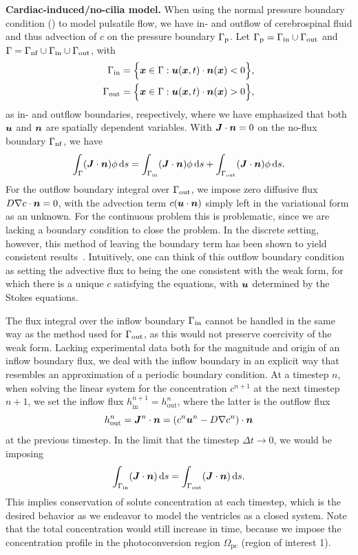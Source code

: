 \documentclass{WileyMSP-template}
\begin{document}
\textbf{Cardiac-induced/no-cilia model.} When using the normal pressure
boundary condition () to model pulsatile flow,
we have in- and outflow of cerebrospinal fluid and thus advection of
$c$ on the pressure boundary $\Gamma_{\mathrm{p}}$.
Let $\Gamma_{\mathrm{p}}=\Gamma_{\mathrm{in}}\cup\Gamma_{\mathrm{out}}$ and $\Gamma = \Gamma_{\mathrm{nf}}\cup\Gamma_{\mathrm{in}}\cup\Gamma_{\mathrm{out}}$, with 
\begin{align*}
    \Gamma_{\mathrm{in}}  &= \Big\{\bm{x}\in\Gamma : \bm{u}(\bm{x}, t)\cdot\bm{n}(\bm{x}) < 0 \Big\}, \\
    \Gamma_{\mathrm{out}} &= \Big\{\bm{x}\in\Gamma : \bm{u}(\bm{x}, t)\cdot\bm{n}(\bm{x}) > 0 \Big\},
\end{align*}
as in- and outflow boundaries, respectively, where we have emphasized that
both $\bm{u}$ and $\bm{n}$ are spatially dependent variables.
With $\bm{J}\cdot\bm{n}=0$ on the no-flux boundary $\Gamma_{\mathrm{nf}}$, we have
\begin{equation*}
    \int_{\Gamma}(\bm{J}\cdot\bm{n})\phi \, \mathrm ds = \int_{\Gamma_{\mathrm{in}}}(\bm{J}\cdot\bm{n})\phi \, \mathrm ds + \int_{\Gamma_{\mathrm{out}}}(\bm{J}\cdot\bm{n})\phi \, \mathrm ds. 
\end{equation*}
For the outflow boundary integral over $\Gamma_{\mathrm{out}}$, we impose zero
diffusive flux $D\nabla c\cdot\bm{n}=0$,
with the advection term $c(\bm{u}\cdot\bm{n})$ simply left in the variational form as an unknown.
For the continuous problem this is problematic, since we are lacking a boundary
condition to close the problem. 
In the discrete setting, however, this method of leaving the boundary term has been shown
to yield consistent results~\cite{Papanastasiou1992ACondition, Lynch2020NumericalHemodynamics,
Griffiths1997TheCondition}. Intuitively, one can think of this outflow boundary condition as
setting the advective flux to being the one consistent with the weak form,
for which there is a unique $c$ satisfying the equations, with $\bm{u}$ determined by
the Stokes equations. 

The flux integral over the inflow boundary $\Gamma_{\mathrm{in}}$ cannot be handled
in the same way as the method used for $\Gamma_{\mathrm{out}}$, as this would not preserve
coercivity of the weak form. Lacking experimental data both for the magnitude and
origin of an inflow boundary flux, we deal with the inflow boundary in an explicit
way that resembles an approximation of a periodic boundary condition. At a timestep $n$,
when solving the linear system for the concentration $c^{n+1}$ at the next timestep $n+1$,
we set the inflow flux $h_{\mathrm{in}}^{n+1} = h_{\mathrm{out}}^{n}$, where the
latter is the outflow flux
\begin{equation*}
    h_{\mathrm{out}}^{n} = \bm{J}^n\cdot\bm{n} = (c^n\bm{u}^n - D\nabla c^n)\cdot\bm{n}
\end{equation*}
at the previous timestep. In the limit that the timestep $\Delta t\to 0$, we would be imposing
\begin{equation*}
    \int_{\Gamma_{\mathrm{in}}}(\bm{J}\cdot\bm{n}) \, \mathrm ds = \int_{\Gamma_{\mathrm{out}}}(\bm{J}\cdot\bm{n}) \, \mathrm ds.
\end{equation*}
This implies conservation of solute concentration at each timestep,
which is the desired behavior
as we endeavor to model the ventricles as a closed system.
Note that the total concentration would still increase in time,
because we impose the concentration profile in the photoconversion
region $\Omega_{\mathrm{pc}}$ (region of interest 1).
\end{document}
